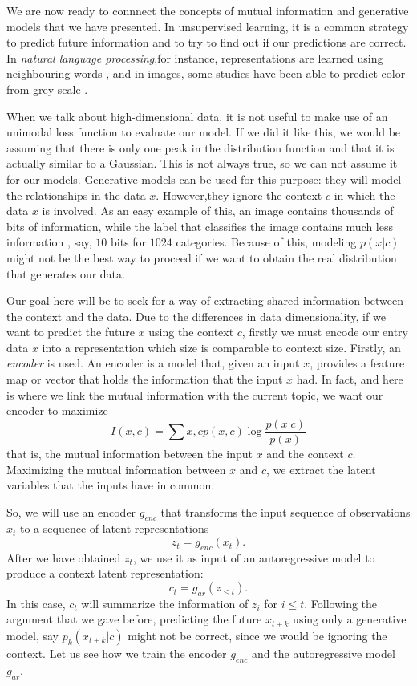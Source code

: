 We are now ready to connnect the concepts of mutual information and generative models that we have presented. In unsupervised learning,
it is a common strategy to predict future information and to try to find out if our predictions are correct.
In \emph{natural language processing},for instance, representations are learned 
using neighbouring words \citep{mikolov_efficient_2013}, and in images, some studies have been able to predict color from grey-scale \citep{doersch_unsupervised_2016}.

When we talk about high-dimensional data, it is not useful to make use of an unimodal loss function to evaluate our model. If we did it like this, we would be assuming that there is only
one peak in the distribution function and that it is actually similar to a Gaussian.  This is not always true, so we can not assume it for our models. Generative models can be used for this purpose:
they will model the relationships in the data $x$. However,they ignore the context $c$ in which the data $x$ is involved. As an easy example of this, an image contains thousands of bits of information,
while the label that classifies the image contains much less information , say, $10$ bits for $1024$ categories. Because of this, modeling $p(x|c)$ might not be the best way to proceed if we want
to obtain the real distribution that generates our data. 

Our goal here will be to seek for a way of extracting shared information between the context and the data. Due to the differences in data dimensionality, if we want to predict the future $x$ using the context $c$, firstly we must
encode our entry data $x$ into a representation which size is comparable to context size. Firstly, an \emph{encoder} is used. An encoder is a model that, given an input $x$, provides a feature map or vector that holds the information
that the input $x$ had. In fact, and here is where we link the mutual information with the current topic, we want our encoder to maximize
$$
I(x,c) = \sum{x,c}p(x,c)\log\frac{p(x|c)}{p(x)}
$$
that is, the mutual information between the input $x$ and the context $c$.  Maximizing the mutual information between $x$ and $c$, we extract the latent variables
that the inputs have in common.

So, we will use an encoder $g_{enc}$ that transforms the input sequence of observations $x_t$ to a sequence of latent representations
$$
z_t = g_{enc}(x_t).
$$
After we have obtained $z_t$, we use it as input of an autoregressive model to produce a context latent representation:
$$
c_t = g_{ar}(z_{\leq t}).
$$
In this case, $c_t$ will summarize the information of $z_i$ for $i \leq t$. Following the argument that we gave before, predicting the future $x_{t+k}$ using only a generative model, say $p_k(x_{t+k}|c)$
might not be correct, since we would be ignoring the context. Let us see how we train the encoder $g_{enc}$ and the autoregressive model $g_{ar}$.

